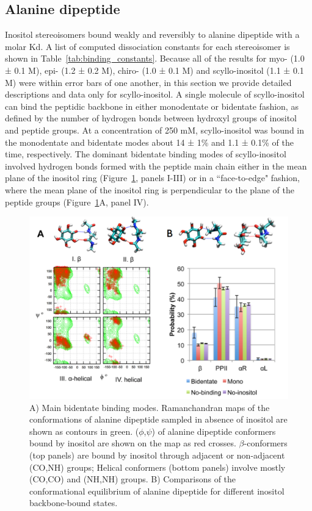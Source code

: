 \subsection{Alanine dipeptide}
Inositol stereoisomers bound weakly and reversibly to alanine dipeptide with a molar Kd. A list of computed dissociation constants for each stereoisomer is shown in Table~\ref{tab:binding_constants}. Because all of the results for myo- (1.0 ± 0.1 M), epi- (1.2 ± 0.2 M), chiro- (1.0 ± 0.1 M) and scyllo-inositol (1.1 ± 0.1 M) were within error bars of one another, in this section we provide detailed descriptions and data only for scyllo-inositol. A single molecule of scyllo-inositol can bind the peptidic backbone in either monodentate or bidentate fashion, as defined by the number of hydrogen bonds between hydroxyl groups of inositol and peptide groups. At a concentration of 250 mM, scyllo-inositol was bound in the monodentate and bidentate modes about 14 ± 1\% and 1.1 ± 0.1\% of the time, respectively. The dominant bidentate binding modes of scyllo-inositol involved hydrogen bonds formed with the peptide main chain either in the mean plane of the inositol ring (Figure~\ref{fig:figure2}, panels I-III) or in a ``face-to-edge" fashion, where the mean plane of the inositol ring is perpendicular to the plane of the peptide groups (Figure~\ref{fig:figure2}A, panel IV).
	
	\begin{figure}[htbp]
    \centering
    \includegraphics[width=6in]{figures/results1/GA4_paper_figures_submitted-2-rearranged}
    \caption[Binding of scyllo-inositol to the backbone of alanine dipeptide.]
     {A) Main bidentate binding modes. Ramanchandran maps of the conformations of alanine dipeptide sampled in absence of inositol are shown as contours in green. ($\phi$,$\psi$) of alanine dipeptide conformers bound by inositol are shown on the map as red crosses. $\beta$-conformers (top panels) are bound by inositol through adjacent or non-adjacent (CO,NH) groups; Helical conformers (bottom panels) involve mostly (CO,CO) and (NH,NH) groups. B) Comparisons of the conformational equilibrium of alanine dipeptide for different inositol backbone-bound states.}
     \label{fig:figure2}
  \end{figure}
  
